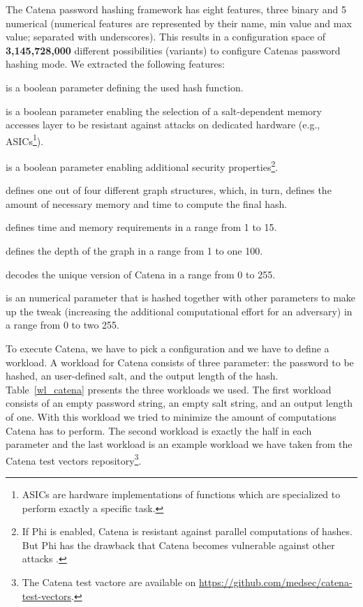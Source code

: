 The Catena password hashing framework has eight features, three binary and 5 numerical (numerical features are represented by their name, min value and max value; separated with underscores). This results in a configuration space of \textbf{3,145,728,000} different possibilities (variants) to configure Catenas password hashing mode. We extracted the following features:


\begin{description}[style=multiline,leftmargin=7em]
	\item [Hash] is a boolean parameter defining the used hash function.
	\item [Gamma] is a boolean parameter enabling the selection of a salt-dependent memory accesses layer to be resistant against attacks on dedicated hardware (e.g., ASICs\footnote{ASICs are hardware implementations of functions which are specialized to perform exactly a specific task.}).
	\item [Phi] is a boolean parameter enabling additional security properties\footnote{If Phi is enabled, Catena is resistant against parallel computations of hashes. But Phi has the drawback that Catena becomes vulnerable against other attacks \cite{10.1007/978-3-319-29938-9_7}.}.
	\item [Graph] defines one out of four different graph structures, which, in turn, defines the amount of necessary memory and time to compute the final hash.
	\item [Garlic] defines time and memory requirements in a range from 1 to 15.
	\item [Lambda] defines the depth of the graph in a range from 1 to one 100.
	\item [VID] decodes the unique version of Catena in a range from 0 to 255.
	\item [D] is an numerical parameter that is hashed together with other parameters to make up the tweak (increasing the additional computational effort for an adversary) in a range from 0 to two 255.
\end{description}

To execute Catena, we have to pick a configuration and we have to define a workload. A workload for Catena consists of three parameter: the password to be hashed, an user-defined salt, and the output length of the hash. Table~\ref{wl_catena} presents the three workloads we used. The first workload consists of an empty password string, an empty salt string, and an output length of one. With this workload we tried to minimize the amount of computations Catena has to perform. The second workload is exactly the half in each parameter and the last workload is an example workload we have taken from the Catena test vectors repository\footnote{The Catena test vactore are available on \url{https://github.com/medsec/catena-test-vectors}.}.

